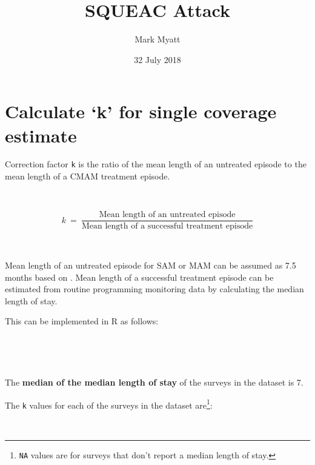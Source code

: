 \documentclass[12pt,a4paper]{article}
\title{SQUEAC Attack}
\author{Mark Myatt}
\date{32 July 2018}
\newenvironment{Shaded}{\begin{snugshade}}{\end{snugshade}}
\newcommand{\KeywordTok}[1]{\textcolor[rgb]{0.13,0.29,0.53}{\textbf{#1}}}
\newcommand{\DataTypeTok}[1]{\textcolor[rgb]{0.13,0.29,0.53}{#1}}
\newcommand{\DecValTok}[1]{\textcolor[rgb]{0.00,0.00,0.81}{#1}}
\newcommand{\FloatTok}[1]{\textcolor[rgb]{0.00,0.00,0.81}{#1}}
\newcommand{\StringTok}[1]{\textcolor[rgb]{0.31,0.60,0.02}{#1}}
\newcommand{\OtherTok}[1]{\textcolor[rgb]{0.56,0.35,0.01}{#1}}
\newcommand{\OperatorTok}[1]{\textcolor[rgb]{0.81,0.36,0.00}{\textbf{#1}}}
\newcommand{\NormalTok}[1]{#1}
\let\rmarkdownfootnote\footnote%
\def\footnote{\protect\rmarkdownfootnote}
\begin{document}
\maketitle

{
\hypersetup{linkcolor=black}
\setcounter{tocdepth}{2}
\tableofcontents
}
\newpage

\hypertarget{k}{%
\section{Calculate `k' for single coverage estimate}\label{k}}

Correction factor \texttt{k} is the ratio of the mean length of an
untreated episode to the mean length of a CMAM treatment episode.

~

\[ k ~ = ~ \frac{\text{Mean length of an untreated episode}}{\text{Mean length of a successful treatment episode}} \]

~

Mean length of an untreated episode for SAM or MAM can be assumed as 7.5
months based on \citet{Garenne:2009fq}. Mean length of a successful
treatment episode can be estimated from routine programming monitoring
data by calculating the median length of stay.

This can be implemented in R as follows:

~

\begin{Shaded}
\end{Shaded}

~

The \textbf{median of the median length of stay} of the surveys in the
dataset is 7.

The \texttt{k} values for each of the surveys in the dataset
are\footnote{\texttt{NA} values are for surveys that don't report a
  median length of stay.}:

~
\end{document}
